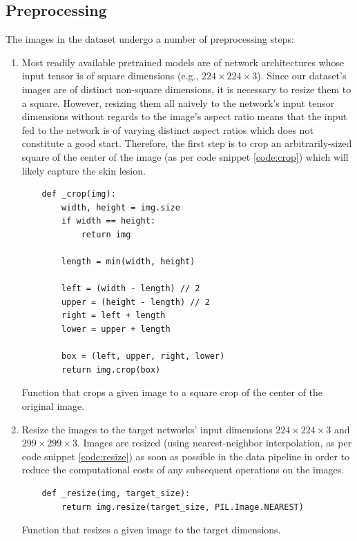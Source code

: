 \subsection{Preprocessing}
\label{subsection:preprocessing}

The images in the dataset undergo a number of preprocessing steps:

\begin{enumerate}
    \item Most readily available pretrained models are of network architectures whose input tensor is of square dimensions (e.g., $224 \times 224 \times 3$). Since our dataset's images are of distinct non-square dimensions, it is necessary to resize them to a square. However, resizing them all naively to the network's input tensor dimensions without regards to the image's aspect ratio means that the input fed to the network is of varying distinct aspect ratios which does not constitute a good start. Therefore, the first step is to crop an arbitrarily-sized square of the center of the image (as per code snippet \ref{code:crop}) which will likely capture the skin lesion.

    \begin{listing}[ht]
    \begin{verbatim}
    def _crop(img):
        width, height = img.size
        if width == height:
            return img

        length = min(width, height)

        left = (width - length) // 2
        upper = (height - length) // 2
        right = left + length
        lower = upper + length

        box = (left, upper, right, lower)
        return img.crop(box)
    \end{verbatim}
    \caption{Function that crops a given image to a square crop of the center of the original image.}
    \label{code:crop}
    \end{listing}

\item Resize the images to the target networks' input dimensions $224 \times 224 \times 3$ and $299 \times 299 \times 3$. Images are resized (using nearest-neighbor interpolation, as per code snippet \ref{code:resize}) as soon as possible in the data pipeline in order to reduce the computational costs of any subsequent operations on the images.

    \begin{listing}[ht]
    \begin{verbatim}
    def _resize(img, target_size):
        return img.resize(target_size, PIL.Image.NEAREST)
    \end{verbatim}
    \caption{Function that resizes a given image to the target dimensions.}
    \label{code:resize}
    \end{listing}


\end{enumerate}
